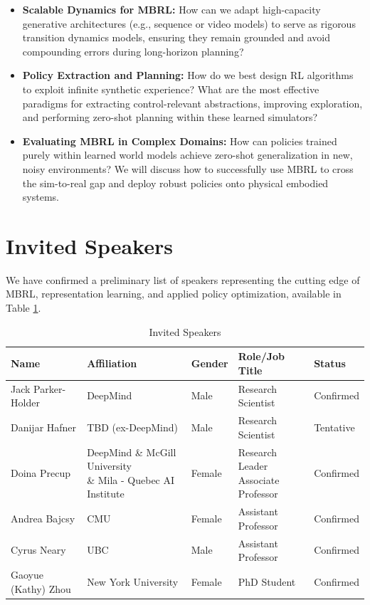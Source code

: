 \documentclass[10pt]{article} %
\begin{document}
\begin{itemize}[leftmargin=*, noitemsep, topsep=0pt]
    \item \textbf{Scalable Dynamics for MBRL:} How can we adapt high-capacity generative architectures (e.g., sequence or video models) to serve as rigorous transition dynamics models, ensuring they remain grounded and avoid compounding errors during long-horizon planning?

    \item \textbf{Policy Extraction and Planning:} How do we best design RL algorithms to exploit infinite synthetic experience? What are the most effective paradigms for extracting control-relevant abstractions, improving exploration, and performing zero-shot planning within these learned simulators?

    \item \textbf{Evaluating MBRL in Complex Domains:} How can policies trained purely within learned world models achieve zero-shot generalization in new, noisy environments? We will discuss how to successfully use MBRL to cross the sim-to-real gap and deploy robust policies onto physical embodied systems.

\end{itemize}


\section{Invited Speakers}

We have confirmed a preliminary list of speakers representing the cutting edge of MBRL, representation learning, and applied policy optimization, available in Table \ref{tab:speaker}. 


\begin{table}[t]
\caption{Invited Speakers}
\label{tab:speaker}
\centering
\footnotesize
\begin{tabular}{lllll}
\toprule
\textbf{Name} & \textbf{Affiliation} & \textbf{Gender} & \textbf{Role/Job Title} & \textbf{Status} \\
\midrule
Jack Parker-Holder & DeepMind & Male & Research Scientist & Confirmed \\
\midrule
Danijar Hafner & TBD (ex-DeepMind) & Male & Research Scientist & Tentative \\
\midrule
Doina Precup & \makecell{DeepMind \& McGill University \\ \& Mila - Quebec AI Institute} & Female & \makecell{Research Leader \\ Associate Professor} & Confirmed \\
\midrule
Andrea Bajcsy & CMU & Female & Assistant Professor & Confirmed \\
\midrule
Cyrus Neary & UBC & Male & Assistant Professor & Confirmed \\
\midrule
Gaoyue (Kathy) Zhou	& New York University & Female & PhD Student & Confirmed \\
\bottomrule
\end{tabular}
\end{table}
\end{document}
